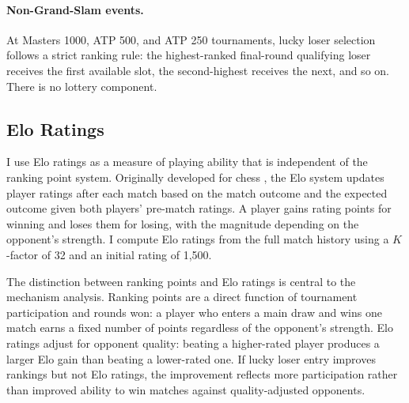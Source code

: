 \paragraph{Non-Grand-Slam events.} At Masters 1000, ATP 500, and ATP 250 tournaments, lucky loser selection follows a strict ranking rule: the highest-ranked final-round qualifying loser receives the first available slot, the second-highest receives the next, and so on. There is no lottery component.

\subsection{Elo Ratings}
\label{sec:background_elo}

I use Elo ratings as a measure of playing ability that is independent of the ranking point system. Originally developed for chess \citep{Klaassen2001_tennis_iid}, the Elo system updates player ratings after each match based on the match outcome and the expected outcome given both players' pre-match ratings. A player gains rating points for winning and loses them for losing, with the magnitude depending on the opponent's strength. I compute Elo ratings from the full match history using a $K$-factor of 32 and an initial rating of 1,500.

The distinction between ranking points and Elo ratings is central to the mechanism analysis. Ranking points are a direct function of tournament participation and rounds won: a player who enters a main draw and wins one match earns a fixed number of points regardless of the opponent's strength. Elo ratings adjust for opponent quality: beating a higher-rated player produces a larger Elo gain than beating a lower-rated one. If lucky loser entry improves rankings but not Elo ratings, the improvement reflects more participation rather than improved ability to win matches against quality-adjusted opponents.
